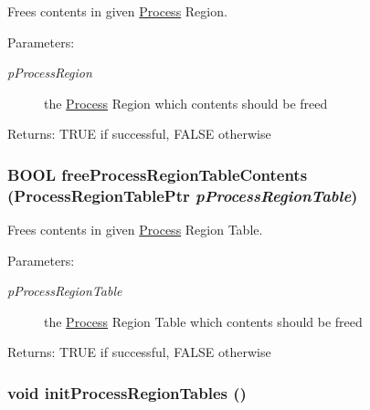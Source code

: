 Frees contents in given \hyperlink{struct_process}{Process} Region. \begin{Desc}
\item[Parameters:]
\begin{description}
\item[{\em pProcessRegion}]the \hyperlink{struct_process}{Process} Region which contents should be freed \end{description}
\end{Desc}
\begin{Desc}
\item[Returns:]TRUE if successful, FALSE otherwise \end{Desc}
\hypertarget{group___v_m_m___p_r_t_g5b19ce07f679920b8eeb08bfe28b37de}{
\subsubsection[{freeProcessRegionTableContents}]{\setlength{\rightskip}{0pt plus 5cm}BOOL freeProcessRegionTableContents (ProcessRegionTablePtr {\em pProcessRegionTable})}}
\label{group___v_m_m___p_r_t_g5b19ce07f679920b8eeb08bfe28b37de}


Frees contents in given \hyperlink{struct_process}{Process} Region Table. \begin{Desc}
\item[Parameters:]
\begin{description}
\item[{\em pProcessRegionTable}]the \hyperlink{struct_process}{Process} Region Table which contents should be freed \end{description}
\end{Desc}
\begin{Desc}
\item[Returns:]TRUE if successful, FALSE otherwise \end{Desc}
\hypertarget{group___v_m_m___p_r_t_g77b59cf14a5524b6cf3ad0455c15b8bb}{
\subsubsection[{initProcessRegionTables}]{\setlength{\rightskip}{0pt plus 5cm}void initProcessRegionTables ()}}
\label{group___v_m_m___p_r_t_g77b59cf14a5524b6cf3ad0455c15b8bb}


